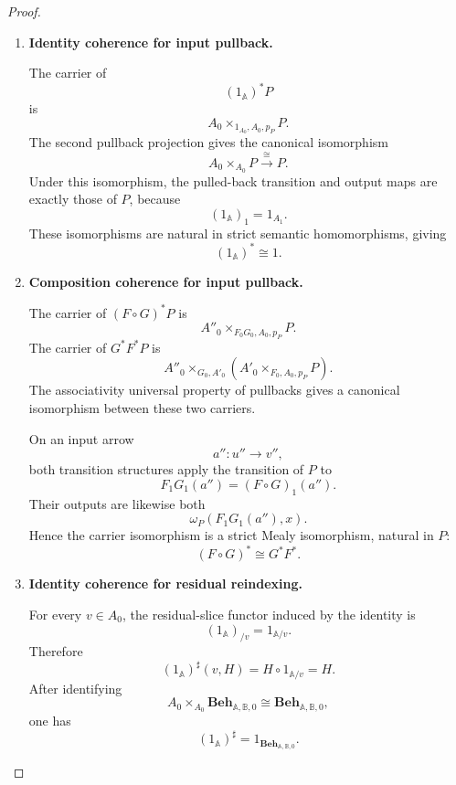 \begin{proof}
    \leavevmode
    \begin{enumerate}
        \item \textbf{Identity coherence for input pullback.}

        The carrier of
        \[
            (1_{\mathbb A})^*P
        \]
        is
        \[
            A_0\times_{1_{A_0},A_0,p_P}P.
        \]
        The second pullback projection gives the canonical isomorphism
        \[
            A_0\times_{A_0}P
            \overset{\cong}{\longrightarrow}
            P.
        \]
        Under this isomorphism, the pulled-back transition and output maps are
        exactly those of \(P\), because
        \[
            (1_{\mathbb A})_1=1_{A_1}.
        \]
        These isomorphisms are natural in strict semantic homomorphisms, giving
        \[
            (1_{\mathbb A})^*
            \cong
            1.
        \]

        \item \textbf{Composition coherence for input pullback.}

        The carrier of \((F\circ G)^*P\) is
        \[
            A''_0
            \times_{F_0G_0,A_0,p_P}
            P.
        \]
        The carrier of \(G^*F^*P\) is
        \[
            A''_0
            \times_{G_0,A'_0}
            \left(
                A'_0
                \times_{F_0,A_0,p_P}
                P
            \right).
        \]
        The associativity universal property of pullbacks gives a canonical
        isomorphism between these two carriers.

        On an input arrow
        \[
            a'':u''\to v'',
        \]
        both transition structures apply the transition of \(P\) to
        \[
            F_1G_1(a'')
            =
            (F\circ G)_1(a'').
        \]
        Their outputs are likewise both
        \[
            \omega_P(F_1G_1(a''),x).
        \]
        Hence the carrier isomorphism is a strict Mealy isomorphism, natural
        in \(P\):
        \[
            (F\circ G)^*
            \cong
            G^*F^*.
        \]

        \item \textbf{Identity coherence for residual reindexing.}

        For every \(v\in A_0\), the residual-slice functor induced by the
        identity is
        \[
            (1_{\mathbb A})_{/v}
            =
            1_{\mathbb A/v}.
        \]
        Therefore
        \[
            (1_{\mathbb A})^\sharp(v,H)
            =
            H\circ1_{\mathbb A/v}
            =
            H.
        \]
        After identifying
        \[
            A_0\times_{A_0}\mathbf{Beh}_{\mathbb A,\mathbb B,0}
            \cong
            \mathbf{Beh}_{\mathbb A,\mathbb B,0},
        \]
        one has
        \[
            (1_{\mathbb A})^\sharp
            =
            1_{\mathbf{Beh}_{\mathbb A,\mathbb B,0}}.
        \]


\end{enumerate}
\end{proof}
